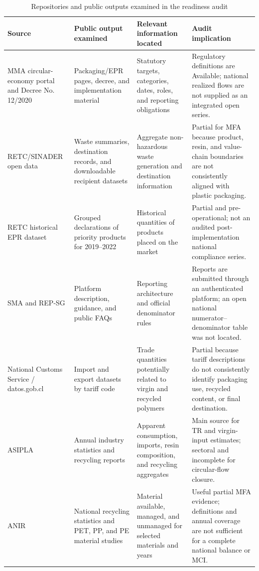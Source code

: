 \documentclass[review,10pt]{elsarticle}
\begin{document}
\begin{longtable}{|L{2.6cm}|L{3.2cm}|L{4.5cm}|L{4.7cm}|}
\caption{Repositories and public outputs examined in the readiness audit}
\label{tab:s_audit_sources}\\
\hline
\textbf{Source} & \textbf{Public output examined} & \textbf{Relevant information located} & \textbf{Audit implication} \\
\hline
\endfirsthead
\hline
MMA circular-economy portal and Decree No. 12/2020 & Packaging/EPR pages, decree, and implementation material & Statutory targets, categories, dates, roles, and reporting obligations & Regulatory definitions are Available; national realized flows are not supplied as an integrated open series. \\
\hline
RETC/SINADER open data & Waste summaries, destination records, and downloadable recipient datasets & Aggregate non-hazardous waste generation and destination information & Partial for MFA because product, resin, and value-chain boundaries are not consistently aligned with plastic packaging. \\
\hline
RETC historical EPR dataset & Grouped declarations of priority products for 2019--2022 & Historical quantities of products placed on the market & Partial and pre-operational; not an audited post-implementation national compliance series. \\
\hline
SMA and REP-SG & Platform description, guidance, and public FAQs & Reporting architecture and official denominator rules & Reports are submitted through an authenticated platform; an open national numerator--denominator table was not located. \\
\hline
National Customs Service / datos.gob.cl & Import and export datasets by tariff code & Trade quantities potentially related to virgin and recycled polymers & Partial because tariff descriptions do not consistently identify packaging use, recycled content, or final destination. \\
\hline
ASIPLA & Annual industry statistics and recycling reports & Apparent consumption, imports, resin composition, and recycling aggregates & Main source for TR and virgin-input estimates; sectoral and incomplete for circular-flow closure. \\
\hline
ANIR & National recycling statistics and PET, PP, and PE material studies & Material available, managed, and unmanaged for selected materials and years & Useful partial MFA evidence; definitions and annual coverage are not sufficient for a complete national balance or MCI. \\

\end{longtable}
\end{document}
